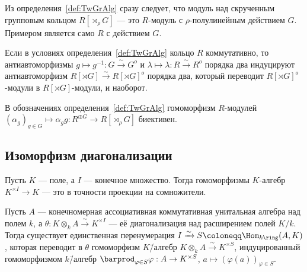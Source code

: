 \documentclass[
	extrafontsizes,
	11pt,
	hyphens,
]{memoir}
\begin{document}
\begin{remark}
Из определения~\ref{def:TwGrAlg} сразу следует, что модуль над скрученным групповым кольцом \(R[\rtimes_\rho G]\) --- это \(R\)-модуль с \(\rho\)-по\-лу\-ли\-ней\-ным действием \(G\).
Примером является само \(R\) с действием \(G\).
\end{remark}

\begin{observation} \label{obs:TwGrAlgInvol}
Если в условиях определения~\ref{def:TwGrAlg} кольцо \(R\) коммутативно,
то антиавтоморфизмы \(g \mapsto g^{-1} : G \xrightarrow{\sim} G^o\) и \(\lambda \mapsto \lambda : R \xrightarrow{\sim} R^o\) порядка два индуцируют антиавтоморфизм \(R[\rtimes G] \xrightarrow{\sim} R[\rtimes G]^o\) порядка два,
который переводит \(R[\rtimes G]^o\)-мо\-ду\-ли в \(R[\rtimes G]\)-мо\-ду\-ли, и наоборот.
\end{observation}

\begin{observation}
В обозначениях определения~\ref{def:TwGrAlg} гомоморфизм \(R\)-мо\-ду\-лей \((\alpha_g)_{g \in G} \mapsto \alpha_g g : R^{\oplus G} \to R[\rtimes_\rho G]\) биективен.
\end{observation}

\subsection{Изоморфизм диагонализации}

\begin{observation}
Пусть \(K\) --- поле, а \(I\) --- конечное множество.%
\label{obs:FieldPowProj}
Тогда
гомоморфизмы \(K\)-алгебр \(K^{\times I} \to K\)
--- это в точности проекции на сомножители.
\end{observation}

\begin{theorem}
Пусть \(A\) --- конечномерная ассоциативная коммутативная унитальная алгебра над полем \(k\),
а \(\theta : K \otimes_k A \xrightarrow{\sim} K^{\times I}\) --- её диагонализация над расширением полей \(K/k\).%
\label{thm:GalIsoOne}
Тогда существует единственная перенумерация \(I \xrightarrow{\sim} S \coloneqq \Hom_{k\ring}(A,K)\), которая переводит в \(\theta\) гомоморфизм
\(K\)\=/алгебр \(K \otimes_k A \xrightarrow{\sim} K^{\times S}\), индуцированный гомоморфизмом \(k\)\=/алгебр \(\barprod_{\varphi \in S} \varphi : A \to K^{\times S}\), \(a \mapsto (\varphi(a))_{\varphi \in S}\).
\end{theorem}
\end{document}
